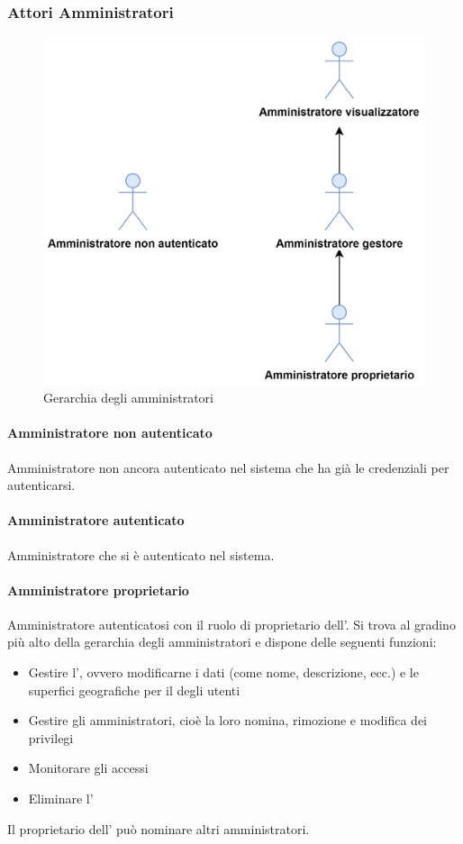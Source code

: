 \subsubsection{Attori Amministratori}
\begin{figure}[h]
  \caption{Gerarchia degli amministratori}
  \centering
    \includegraphics[scale=0.8]{Sezioni/UseCase/Immagini/Amministratori.png}
\end{figure}


\paragraph{Amministratore non autenticato}
Amministratore non ancora autenticato nel sistema che ha già le credenziali per autenticarsi.
\paragraph{Amministratore autenticato}
Amministratore che si è autenticato nel sistema.
\paragraph{Amministratore proprietario}
Amministratore autenticatosi con il ruolo di proprietario dell'.
Si trova al gradino più alto della gerarchia degli amministratori e dispone delle seguenti funzioni:
\begin{itemize}
\item Gestire l', ovvero modificarne i dati (come nome, descrizione, ecc.) e le superfici geografiche per il  degli utenti
\item Gestire gli amministratori, cioè la loro nomina, rimozione e modifica dei privilegi
\item Monitorare gli accessi
\item Eliminare l'
\end{itemize}
Il proprietario dell' può nominare altri amministratori.
